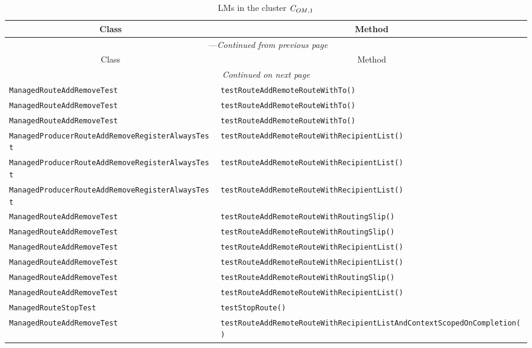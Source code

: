 \begin{center}
\begin{longtable}{ll}
\caption{LMs in the cluster $\mathit{C}_{\mathit{OM},1}$}\\
\toprule\multicolumn{1}{c}{Class}&\multicolumn{1}{c}{Method}\\\midrule
\endfirsthead

\multicolumn{2}{c}{\tablename\ \thetable{}---\textit{Continued from previous page}} \\\midrule
\multicolumn{1}{c}{Class}&\multicolumn{1}{c}{Method}\\\midrule
\endhead
\multicolumn{2}{c}{\textit{Continued on next page}}\\\midrule
\endfoot
\bottomrule
\endlastfoot

\lstinline/ManagedRouteAddRemoveTest/&{\lstinline/testRouteAddRemoteRouteWithTo()/}\\
\lstinline/ManagedRouteAddRemoveTest/&{\lstinline/testRouteAddRemoteRouteWithTo()/}\\
\lstinline/ManagedRouteAddRemoveTest/&{\lstinline/testRouteAddRemoteRouteWithTo()/}\\
\lstinline/ManagedProducerRouteAddRemoveRegisterAlwaysTest/&{\lstinline/testRouteAddRemoteRouteWithRecipientList()/}\\
\lstinline/ManagedProducerRouteAddRemoveRegisterAlwaysTest/&{\lstinline/testRouteAddRemoteRouteWithRecipientList()/}\\
\lstinline/ManagedProducerRouteAddRemoveRegisterAlwaysTest/&{\lstinline/testRouteAddRemoteRouteWithRecipientList()/}\\
\lstinline/ManagedRouteAddRemoveTest/&{\lstinline/testRouteAddRemoteRouteWithRoutingSlip()/}\\
\lstinline/ManagedRouteAddRemoveTest/&{\lstinline/testRouteAddRemoteRouteWithRoutingSlip()/}\\
\lstinline/ManagedRouteAddRemoveTest/&{\lstinline/testRouteAddRemoteRouteWithRecipientList()/}\\
\lstinline/ManagedRouteAddRemoveTest/&{\lstinline/testRouteAddRemoteRouteWithRecipientList()/}\\
\lstinline/ManagedRouteAddRemoveTest/&{\lstinline/testRouteAddRemoteRouteWithRoutingSlip()/}\\
\lstinline/ManagedRouteAddRemoveTest/&{\lstinline/testRouteAddRemoteRouteWithRecipientList()/}\\
\lstinline/ManagedRouteStopTest/&{\lstinline/testStopRoute()/}\\
\lstinline/ManagedRouteAddRemoveTest/&{\lstinline/testRouteAddRemoteRouteWithRecipientListAndContextScopedOnCompletion()/}\\

\end{longtable}
\end{center}
